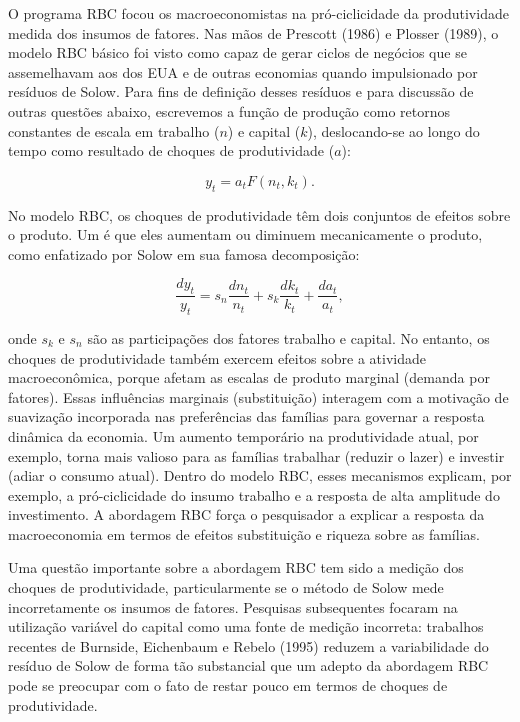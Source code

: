 \documentclass[12pt]{article}
\begin{document}
O programa RBC focou os macroeconomistas na pró-ciclicidade da produtividade medida dos insumos de fatores. Nas mãos de Prescott (1986) e Plosser (1989), o modelo RBC básico foi visto como capaz de gerar ciclos de negócios que se assemelhavam aos dos EUA e de outras economias quando impulsionado por resíduos de Solow. Para fins de definição desses resíduos e para discussão de outras questões abaixo, escrevemos a função de produção como retornos constantes de escala em trabalho ($n$) e capital ($k$), deslocando-se ao longo do tempo como resultado de choques de produtividade ($a$):

\begin{equation}
y_t = a_t F(n_t, k_t). \tag{4.1}
\end{equation}

No modelo RBC, os choques de produtividade têm dois conjuntos de efeitos sobre o produto. Um é que eles aumentam ou diminuem mecanicamente o produto, como enfatizado por Solow em sua famosa decomposição:

\begin{equation}
\frac{dy_t}{y_t} = s_n \frac{dn_t}{n_t} + s_k \frac{dk_t}{k_t} + \frac{da_t}{a_t}, \tag{4.2}
\end{equation}

onde $s_k$ e $s_n$ são as participações dos fatores trabalho e capital. No entanto, os choques de produtividade também exercem efeitos sobre a atividade macroeconômica, porque afetam as escalas de produto marginal (demanda por fatores). Essas influências marginais (substituição) interagem com a motivação de suavização incorporada nas preferências das famílias para governar a resposta dinâmica da economia. Um aumento temporário na produtividade atual, por exemplo, torna mais valioso para as famílias trabalhar (reduzir o lazer) e investir (adiar o consumo atual). Dentro do modelo RBC, esses mecanismos explicam, por exemplo, a pró-ciclicidade do insumo trabalho e a resposta de alta amplitude do investimento. A abordagem RBC força o pesquisador a explicar a resposta da macroeconomia em termos de efeitos substituição e riqueza sobre as famílias.

Uma questão importante sobre a abordagem RBC tem sido a medição dos choques de produtividade, particularmente se o método de Solow mede incorretamente os insumos de fatores. Pesquisas subsequentes focaram na utilização variável do capital como uma fonte de medição incorreta: trabalhos recentes de Burnside, Eichenbaum e Rebelo (1995) reduzem a variabilidade do resíduo de Solow de forma tão substancial que um adepto da abordagem RBC pode se preocupar com o fato de restar pouco em termos de choques de produtividade.
\end{document}
